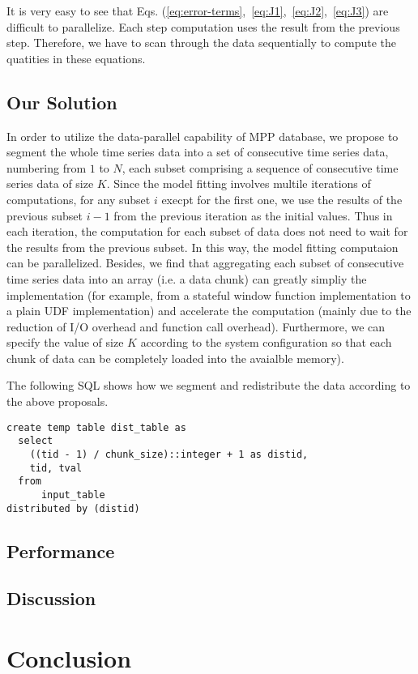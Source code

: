 \documentclass[english,12pt]{article}
\begin{document}
It is very easy to see that Eqs.
(\ref{eq:error-terms},~\ref{eq:J1},~\ref{eq:J2},~\ref{eq:J3}) are
difficult to parallelize. Each step computation uses the result from the
previous step. Therefore, we have to scan through the data sequentially to
compute the quatities in these equations.

\subsection{Our Solution}


In order to utilize the data-parallel capability of MPP database, we propose to segment the whole time series data into a set of consecutive time series data, numbering from $1$ to $N$, each subset comprising a sequence of consecutive time series data of size $K$. Since the model fitting involves multile iterations of computations, for any subset $i$ execpt for the first one, we use the results of the previous subset $i-1$ from the previous iteration as the initial values. Thus in each iteration, the computation for each subset of data does not need to wait for the results from the previous subset. In this way, the model fitting computaion can be parallelized. Besides, we find that aggregating each subset of consecutive time series data into an array (i.e. a data chunk) can greatly simpliy the implementation (for example, from a stateful window function implementation to a plain UDF implementation) and accelerate the computation (mainly due to the reduction of I/O overhead and function call overhead). Furthermore, we can specify the value of size $K$  according to the system configuration so that each chunk of data can be completely loaded into the avaialble memory).

The following SQL shows how we segment and redistribute the data according to the above proposals. 

\begin{verbatim}
create temp table dist_table as
  select
    ((tid - 1) / chunk_size)::integer + 1 as distid, 
    tid, tval
  from 
      input_table
distributed by (distid)
\end{verbatim}

\subsection{Performance}


\subsection{Discussion}


\section{Conclusion}




\end{document}
